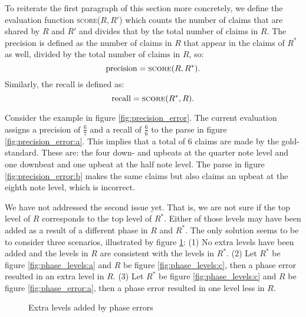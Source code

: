To reiterate the first paragraph of this section more concretely, we define the evaluation function \textsc{score}($R, R'$) which counts the number of claims that are shared by $R$ and $R'$ and divides that by the total number of claims in $R$. The precision is defined as the number of claims in $R$ that appear in the claims of $R^*$ as well, divided by the total number of claims in $R$, so:
\begin{equation}
\label{eq:precision}
\mathrm{precision} = \textsc{score}(R, R^*).
\end{equation}
Similarly, the recall is defined as:
\begin{equation}
\label{eq:recall}
\mathrm{recall} = \textsc{score}(R^*, R).
\end{equation}

Consider the example in figure \ref{fig:precision_error}. The current evaluation assigns a precision of $\frac{6}{7}$ and a recall of $\frac{6}{6}$ to the parse in figure \ref{fig:precision_error:a}. This implies that a total of $6$ claims are made by the gold-standard. These are: the four down- and upbeats at the quarter note level and one downbeat and one upbeat at the half note level. The parse in figure \ref{fig:precision_error:b} makes the same claims but also claims an upbeat at the eighth note level, which is incorrect.

We have not addressed the second issue yet. That is, we are not sure if the top level of $R$ corresponds to the top level of $R^*$. Either of those levels may have been added as a result of a different phase in $R$ and $R^*$. The only solution seems to be to consider three scenarios, illustrated by figure \ref{fig:phase_levels}: (1) No extra levels have been added and the levels in $R$ are consistent with the levels in $R^*$. (2) Let $R^*$ be figure \ref{fig:phase_levels:a} and $R$ be figure \ref{fig:phase_levels:c}, then a phase error resulted in an extra level in $R$. (3) Let $R^*$ be figure \ref{fig:phase_levels:c} and $R$ be figure \ref{fig:phase_error:a}, then a phase error resulted in one level less in $R$. 


\begin{figure}
\caption{Extra levels added by phase errors}
\label{fig:phase_levels}
\end{figure}

